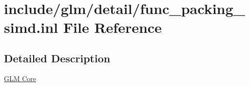 \hypertarget{func__packing__simd_8inl}{}\section{include/glm/detail/func\+\_\+packing\+\_\+simd.inl File Reference}
\label{func__packing__simd_8inl}


\subsection{Detailed Description}
\hyperlink{group__core}{G\+LM Core} 